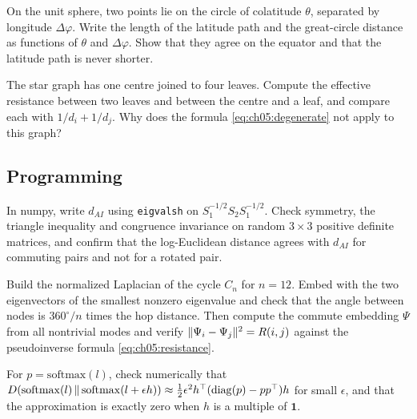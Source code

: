 \begin{exercise}\label{exr:ch05:latitude}
On the unit sphere, two points lie on the circle of colatitude $\theta$, separated by longitude $\Delta\varphi$. Write the length of the latitude path and the great-circle distance as functions of $\theta$ and $\Delta\varphi$. Show that they agree on the equator and that the latitude path is never shorter.
\end{exercise}

\begin{exercise}\label{exr:ch05:star}
The star graph has one centre joined to four leaves. Compute the effective resistance between two leaves and between the centre and a leaf, and compare each with $1/d_i+1/d_j$. Why does the formula \eqref{eq:ch05:degenerate} not apply to this graph?
\end{exercise}

\subsection*{Programming}

\begin{exercise}\label{exr:ch05:code-spd}
In numpy, write $d_{AI}$ using \texttt{eigvalsh} on $S_1^{-1/2}S_2S_1^{-1/2}$. Check symmetry, the triangle inequality and congruence invariance on random $3\times3$ positive definite matrices, and confirm that the log-Euclidean distance agrees with $d_{AI}$ for commuting pairs and not for a rotated pair.
\end{exercise}

\begin{exercise}\label{exr:ch05:code-cycle}
Build the normalized Laplacian of the cycle $C_n$ for $n=12$. Embed with the two eigenvectors of the smallest nonzero eigenvalue and check that the angle between nodes is $360^\circ/n$ times the hop distance. Then compute the commute embedding $\Psi$ from all nontrivial modes and verify $\lVert \Psi_i-\Psi_j\rVert^2=R(i,j)$ against the pseudoinverse formula \eqref{eq:ch05:resistance}.
\end{exercise}

\begin{exercise}\label{exr:ch05:code-softmax}
For $p=\mathrm{softmax}(l)$, check numerically that $D\!\left(\mathrm{softmax}(l)\,\middle\|\,\mathrm{softmax}(l+\epsilon h)\right)\approx\tfrac12\epsilon^2h^{\top}(\operatorname{diag}(p)-pp^{\top})h$ for small $\epsilon$, and that the approximation is exactly zero when $h$ is a multiple of $\mathbf 1$.
\end{exercise}

